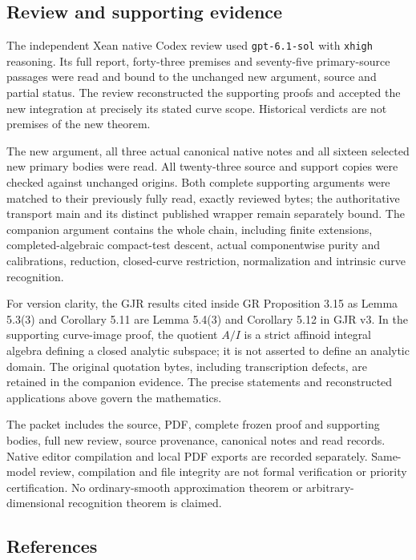 \documentclass[
  11pt,
]{article}
\begin{document}
\subsection{Review and supporting evidence}

The independent Xean native Codex review used \texttt{gpt-6.1-sol} with
\texttt{xhigh} reasoning. Its full report, forty-three premises and
seventy-five primary-source passages were read and bound to the unchanged
new argument, source and partial status. The review reconstructed the
supporting proofs and accepted the new integration at precisely its stated
curve scope. Historical verdicts are not premises of the new theorem.

The new argument, all three actual canonical native notes and all sixteen
selected new primary bodies were read. All twenty-three source and support
copies were checked against unchanged origins. Both complete supporting
arguments were matched to their previously fully read, exactly reviewed
bytes; the authoritative transport main and its distinct published wrapper
remain separately bound. The companion argument contains the whole chain,
including finite extensions, completed-algebraic compact-test descent,
actual componentwise purity and calibrations, reduction, closed-curve
restriction, normalization and intrinsic curve recognition.

For version clarity, the GJR results cited inside GR Proposition 3.15
as Lemma 5.3(3) and Corollary 5.11 are Lemma 5.4(3) and Corollary 5.12
in GJR v3. In the supporting curve-image proof, the quotient \(A/I\)
is a strict affinoid integral algebra defining a closed analytic subspace;
it is not asserted to define an analytic domain. The original quotation
bytes, including transcription defects, are retained in the companion
evidence. The precise statements and reconstructed applications above
govern the mathematics.

The packet includes the source, PDF, complete frozen proof and supporting
bodies, full new review, source provenance, canonical notes and read records.
Native editor compilation and local PDF exports are recorded separately.
Same-model review, compilation and file integrity are not formal verification
or priority certification. No ordinary-smooth approximation theorem or
arbitrary-dimensional recognition theorem is claimed.

\subsection{References}\label{references}
\end{document}
